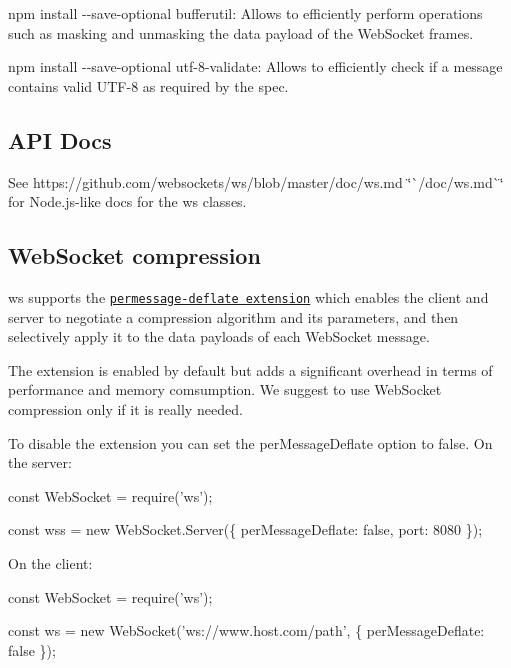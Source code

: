 \begin{DoxyItemize}
\item {\ttfamily npm install -\/-\/save-\/optional bufferutil}\+: Allows to efficiently perform operations such as masking and unmasking the data payload of the Web\+Socket frames.
\item {\ttfamily npm install -\/-\/save-\/optional utf-\/8-\/validate}\+: Allows to efficiently check if a message contains valid U\+T\+F-\/8 as required by the spec.
\end{DoxyItemize}

\subsection*{A\+PI Docs}

See https\+://github.com/websockets/ws/blob/master/doc/ws.\+md \char`\"{}\`{}/doc/ws.\+md\`{}\char`\"{} for Node.\+js-\/like docs for the ws classes.

\subsection*{Web\+Socket compression}

{\ttfamily ws} supports the \href{https://tools.ietf.org/html/rfc7692}{\tt permessage-\/deflate extension} which enables the client and server to negotiate a compression algorithm and its parameters, and then selectively apply it to the data payloads of each Web\+Socket message.

The extension is enabled by default but adds a significant overhead in terms of performance and memory comsumption. We suggest to use Web\+Socket compression only if it is really needed.

To disable the extension you can set the {\ttfamily per\+Message\+Deflate} option to {\ttfamily false}. On the server\+:


\begin{DoxyCode}
const WebSocket = require('ws');

const wss = new WebSocket.Server(\{
  perMessageDeflate: false,
  port: 8080
\});
\end{DoxyCode}


On the client\+:


\begin{DoxyCode}
const WebSocket = require('ws');

const ws = new WebSocket('ws://www.host.com/path', \{
  perMessageDeflate: false
\});
\end{DoxyCode}


